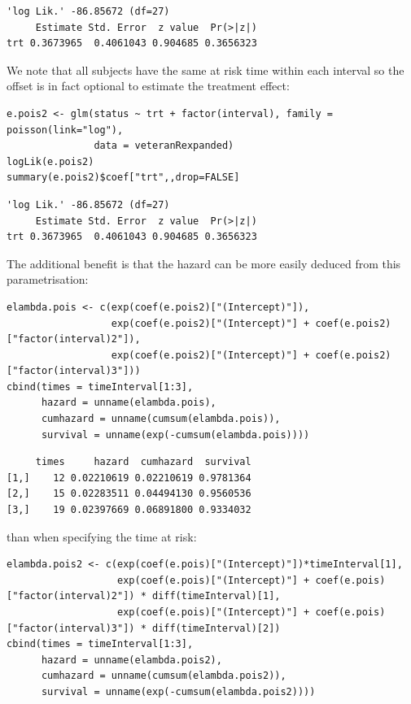 \documentclass{article}
\begin{document}
\begin{verbatim}
'log Lik.' -86.85672 (df=27)
     Estimate Std. Error  z value  Pr(>|z|)
trt 0.3673965  0.4061043 0.904685 0.3656323
\end{verbatim}


We note that all subjects have the same at risk time within each
interval so the offset is in fact optional to estimate the treatment effect:
\lstset{language=r,label= ,caption= ,captionpos=b,numbers=none}
\begin{lstlisting}
e.pois2 <- glm(status ~ trt + factor(interval), family = poisson(link="log"),
               data = veteranRexpanded)
logLik(e.pois2)
summary(e.pois2)$coef["trt",,drop=FALSE]
\end{lstlisting}

\begin{verbatim}
'log Lik.' -86.85672 (df=27)
     Estimate Std. Error  z value  Pr(>|z|)
trt 0.3673965  0.4061043 0.904685 0.3656323
\end{verbatim}


The additional benefit is that the hazard can be more easily deduced
from this parametrisation:
\lstset{language=r,label= ,caption= ,captionpos=b,numbers=none}
\begin{lstlisting}
elambda.pois <- c(exp(coef(e.pois2)["(Intercept)"]),
                  exp(coef(e.pois2)["(Intercept)"] + coef(e.pois2)["factor(interval)2"]),
                  exp(coef(e.pois2)["(Intercept)"] + coef(e.pois2)["factor(interval)3"]))
cbind(times = timeInterval[1:3],
      hazard = unname(elambda.pois),
      cumhazard = unname(cumsum(elambda.pois)),
      survival = unname(exp(-cumsum(elambda.pois)))) 
\end{lstlisting}

\begin{verbatim}
     times     hazard  cumhazard  survival
[1,]    12 0.02210619 0.02210619 0.9781364
[2,]    15 0.02283511 0.04494130 0.9560536
[3,]    19 0.02397669 0.06891800 0.9334032
\end{verbatim}


than when specifying the time at risk:
\lstset{language=r,label= ,caption= ,captionpos=b,numbers=none}
\begin{lstlisting}
elambda.pois2 <- c(exp(coef(e.pois)["(Intercept)"])*timeInterval[1],
                   exp(coef(e.pois)["(Intercept)"] + coef(e.pois)["factor(interval)2"]) * diff(timeInterval)[1],
                   exp(coef(e.pois)["(Intercept)"] + coef(e.pois)["factor(interval)3"]) * diff(timeInterval)[2])
cbind(times = timeInterval[1:3],
      hazard = unname(elambda.pois2),
      cumhazard = unname(cumsum(elambda.pois2)),
      survival = unname(exp(-cumsum(elambda.pois2)))) 
\end{lstlisting}
\end{document}
